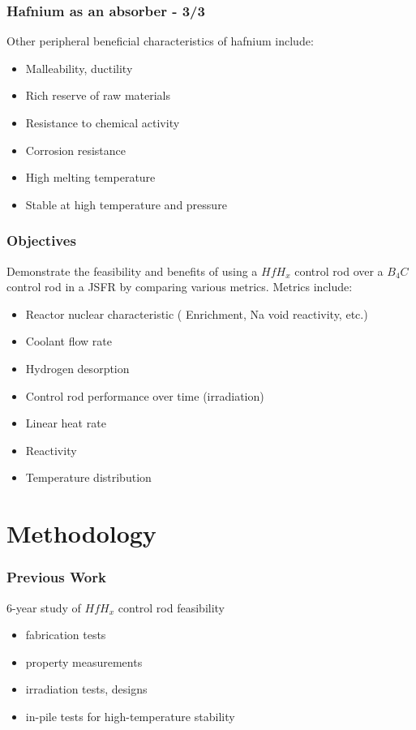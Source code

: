 \documentclass[9pt]{beamer}
\newcommand{\hfh}{$HfH_{x}$\xspace}
\newcommand{\bc}{$B_4C$\xspace}
\begin{document}
\begin{frame}
\frametitle{Hafnium as an absorber - 3/3}
Other peripheral beneficial characteristics of hafnium include:
\begin{itemize}
  \item Malleability, ductility
  \item Rich reserve of raw materials
  \item Resistance to chemical activity
  \item Corrosion resistance
  \item High melting temperature
  \item Stable at high temperature and pressure
\end{itemize}
\end{frame}

\begin{frame}
\frametitle{Objectives}
Demonstrate the feasibility and benefits of using a \hfh control rod
over a \bc control rod in a \gls{JSFR} by comparing various metrics.
Metrics include:
\begin{itemize}
    \item Reactor nuclear characteristic ( Enrichment, Na void reactivity, etc.)
    \item Coolant flow rate
    \item Hydrogen desorption
    \item Control rod performance over time (irradiation)
    \item Linear heat rate
    \item Reactivity
    \item Temperature distribution
\end{itemize}
\end{frame}


\section{Methodology}


\begin{frame}
\frametitle{Previous Work}
6-year study of \hfh control rod feasibility
\begin{itemize}
    \item fabrication tests \cite{konashi_study_2010}
    \item property measurements \cite{konashi_utilization_2010}
    \item irradiation tests, designs \cite{konashi_environmentally_2012}
    \item in-pile tests for high-temperature stability \cite{hirai_study_2010}
\end{itemize}
\end{frame}
\end{document}
